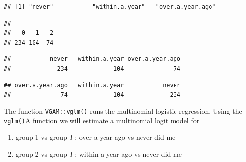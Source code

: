 \documentclass[
  10pt,
]{krantz}
\newenvironment{Shaded}{\begin{snugshade}}{\end{snugshade}}
\newcommand{\AttributeTok}[1]{\textcolor[rgb]{0.77,0.63,0.00}{#1}}
\newcommand{\FunctionTok}[1]{\textcolor[rgb]{0.00,0.00,0.00}{#1}}
\newcommand{\NormalTok}[1]{#1}
\newcommand{\OtherTok}[1]{\textcolor[rgb]{0.56,0.35,0.01}{#1}}
\newcommand{\SpecialCharTok}[1]{\textcolor[rgb]{0.00,0.00,0.00}{#1}}
\newcommand{\StringTok}[1]{\textcolor[rgb]{0.31,0.60,0.02}{#1}}
\providecommand{\tightlist}{%
  \setlength{\itemsep}{0pt}\setlength{\parskip}{0pt}}
\begin{document}
\begin{Shaded}
\end{Shaded}

\begin{verbatim}
## [1] "never"           "within.a.year"   "over.a.year.ago"
\end{verbatim}

\begin{Shaded}
\end{Shaded}

\begin{verbatim}
## 
##   0   1   2 
## 234 104  74
\end{verbatim}

\begin{verbatim}
##           never   within.a.year over.a.year.ago 
##             234             104              74
\end{verbatim}

\begin{verbatim}
## over.a.year.ago   within.a.year           never 
##              74             104             234
\end{verbatim}

The function \texttt{VGAM::vglm()} runs the multinomial logistic regression. Using the \texttt{vglm()}A function we will estimate a multinomial logit model for

\begin{enumerate}
\def\labelenumi{\arabic{enumi}.}
\tightlist
\item
  group 1 vs group 3 : over a year ago vs never did me
\item
  group 2 vs group 3 : within a year ago vs never did me
\end{enumerate}
\end{document}
